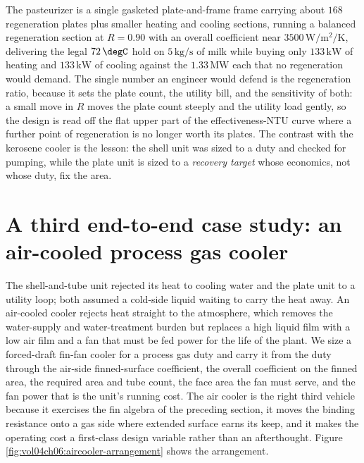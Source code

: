 The pasteurizer is a single gasketed plate-and-frame frame carrying about $168$
regeneration plates plus smaller heating and cooling sections, running a balanced
regeneration section at $R = 0.90$ with an overall coefficient near $3500\,
\si{\watt\per\meter\squared\per\kelvin}$, delivering the legal $72\,\degC$ hold
on $5\,\text{kg/s}$ of milk while buying only $133\,\text{kW}$ of heating and
$133\,\text{kW}$ of cooling against the $1.33\,\text{MW}$ each that no
regeneration would demand. The single number an engineer would defend is the
regeneration ratio, because it sets the plate count, the utility bill, and the
sensitivity of both: a small move in $R$ moves the plate count steeply and the
utility load gently, so the design is read off the flat upper part of the
effectiveness-NTU curve where a further point of regeneration is no longer worth
its plates. The contrast with the kerosene cooler is the lesson: the shell unit
was sized to a duty and checked for pumping, while the plate unit is sized to a
\emph{recovery target} whose economics, not whose duty, fix the area.

\section{A third end-to-end case study: an air-cooled process gas cooler}

The shell-and-tube unit rejected its heat to cooling water and the plate unit to a
utility loop; both assumed a cold-side liquid waiting to carry the heat away. An
air-cooled cooler rejects heat straight to the atmosphere, which removes the
water-supply and water-treatment burden but replaces a high liquid film with a
low air film and a fan that must be fed power for the life of the plant. We size a
forced-draft fin-fan cooler for a process gas duty and carry it from the duty
through the air-side finned-surface coefficient, the overall coefficient on the
finned area, the required area and tube count, the face area the fan must serve,
and the fan power that is the unit's running cost. The air cooler is the right
third vehicle because it exercises the fin algebra of the preceding section, it
moves the binding resistance onto a gas side where extended surface earns its
keep, and it makes the operating cost a first-class design variable rather than an
afterthought. Figure \ref{fig:vol04ch06:aircooler-arrangement} shows the
arrangement.



